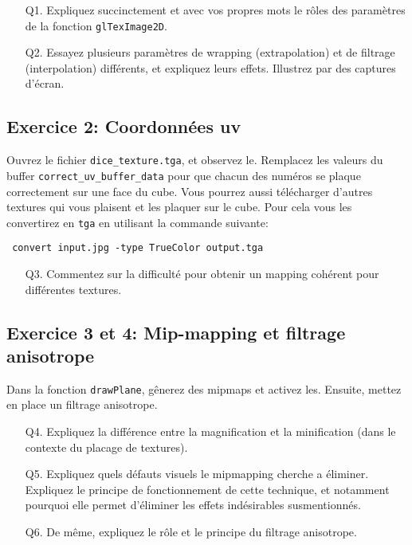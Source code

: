 \documentclass{article}
\begin{document}
\begin{itemize}
  \item[Q1.] Expliquez succinctement et avec vos propres mots le rôles des
  paramètres de la fonction \verb|glTexImage2D|.
  \item[Q2.] Essayez plusieurs paramètres de wrapping (extrapolation) et de
  filtrage (interpolation) différents,
  et expliquez leurs effets. Illustrez par des captures d'écran.
\end{itemize}

\subsection{Exercice 2: Coordonnées uv}%

Ouvrez le fichier \verb|dice_texture.tga|, et observez le. Remplacez les valeurs
du buffer \verb|correct_uv_buffer_data| pour que chacun des numéros se plaque
correctement sur une face du cube. Vous pourrez aussi télécharger d'autres
textures qui vous plaisent et les plaquer sur le cube. Pour cela vous les
convertirez en \verb|tga| en utilisant la commande suivante:

\begin{verbatim}
 convert input.jpg -type TrueColor output.tga 
\end{verbatim}

\begin{itemize}
  \item[Q3.] Commentez sur la difficulté pour obtenir un mapping cohérent pour
  différentes textures.
\end{itemize}

\subsection{Exercice 3 et 4: Mip-mapping et filtrage anisotrope}%

Dans la fonction \verb|drawPlane|, gênerez des mipmaps et activez les. Ensuite,
mettez en place un filtrage anisotrope.

\begin{itemize}
  \item[Q4.] Expliquez la différence entre la magnification et la minification
  (dans le contexte du placage de textures).
  \item[Q5.] Expliquez quels défauts visuels le mipmapping cherche a éliminer.
  Expliquez le principe de fonctionnement de cette technique, et notamment
  pourquoi elle permet d'éliminer les effets indésirables susmentionnés.
  \item[Q6.] De même, expliquez le rôle et le principe du filtrage anisotrope.
\end{itemize}
\end{document}
